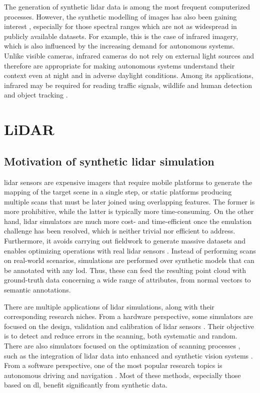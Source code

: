 The generation of synthetic \acrshort{lidar} data is among the most frequent computerized processes. However, the synthetic modelling of images has also been gaining interest \cite{yi_cycle_2023, ozkanoglu_infragan_2022}, especially for those spectral ranges which are not as widespread in publicly available datasets. For example, this is the case of infrared imagery, which is also influenced by the increasing demand for autonomous systems. Unlike visible cameras, infrared cameras do not rely on external light sources and therefore are appropriate for making autonomous systems understand their context even at night and in adverse daylight conditions. Among its applications, infrared may be required for reading traffic signals, wildlife and human detection and object tracking \cite{vollmer_infrared_2017}. 

\section{LiDAR} 

\subsection{Motivation of synthetic \acrshort{lidar} simulation}

\acrshort{lidar} sensors are expensive imagers that require mobile platforms to generate the mapping of the target scene in a single step, or static platforms producing multiple scans that must be later joined using overlapping features. The former is more prohibitive, while the latter is typically more time-consuming. On the other hand, \acrshort{lidar} simulators are much more cost- and time-efficient once the emulation challenge has been resolved, which is neither trivial nor efficient to address. Furthermore, it avoids carrying out fieldwork to generate massive datasets and enables optimizing operations with real \acrshort{lidar} sensors \cite{mohan_robust_2019, li_3d_2022}. Instead of performing scans on real-world scenarios, simulations are performed over synthetic models that can be annotated with any \acrshort{lod}. Thus, these can feed the resulting point cloud with ground-truth data concerning a wide range of attributes, from normal vectors to semantic annotations. 

There are multiple applications of \acrshort{lidar} simulations, along with their corresponding research niches. From a hardware perspective, some simulators are focused on the design, validation and calibration of \acrshort{lidar} sensors \cite{lee_validation_2020}. Their objective is to detect and reduce errors in the scanning, both systematic and random. There are also simulators focused on the optimization of scanning processes \cite{iqbal_simulation_2020, westling_simtreels_2020}, such as the integration of \acrshort{lidar} data into enhanced and synthetic vision systems \cite{peinecke_lidar_2008}. From a software perspective, one of the most popular research topics is autonomous driving \cite{fang_augmented_2020, li_deep_2020} and navigation \cite{manivasagam_lidarsim_2020}. Most of these methods, especially those based on \acrshort{dl}, benefit significantly from synthetic data. 

